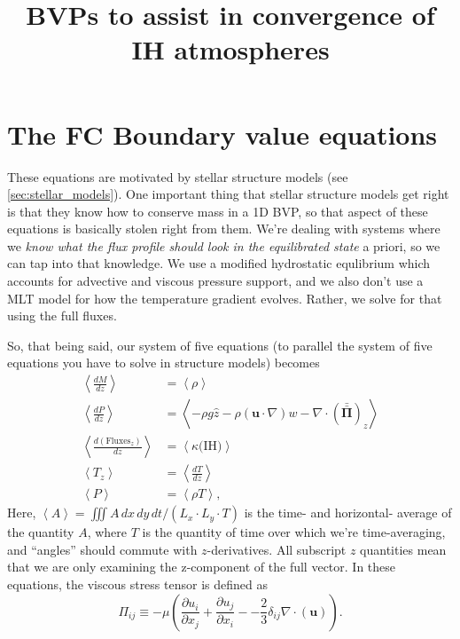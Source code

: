 \documentclass[aps, pre, onecolumn, nofootinbib, notitlepage, groupedaddress, amsfonts, amssymb, amsmath, longbibliography]{revtex4-1}
\newcommand{\Div}[1]{\ensuremath{\nabla\cdot\left( #1\right)}}
\newcommand{\angles}[1]{\ensuremath{\left\langle #1 \right\rangle}}
\newcommand{\grad}{\ensuremath{\nabla}}
\newcommand{\stressT}{\ensuremath{\bm{\bar{\bar{\Pi}}}}}
\begin{document}
\title{BVPs to assist in convergence of IH atmospheres}
\maketitle

\section{The FC Boundary value equations}
These equations are motivated by stellar structure models (see \ref{sec:stellar_models}).
One important thing that stellar structure models get right is that they know how to
conserve mass in a 1D BVP, so that aspect of these equations is basically stolen right
from them.  We're dealing with systems where we \emph{know what the flux profile should
look in the equilibrated state} a priori, so we can tap into that knowledge.  We use
a modified hydrostatic equlibrium which accounts for advective and viscous pressure
support, and we also don't use a MLT model for how the temperature gradient evolves.
Rather, we solve for that using the full fluxes.

So, that being said, our system of five equations (to parallel the system of 
five equations you have to solve in structure models) becomes
\begin{equation}
\begin{split}
\angles{\frac{d M}{dz}} &= \angles{\rho} \\
\angles{\frac{d P}{dz}} &= \angles{-\rho g \hat{z} - \rho (\bm{u}\cdot\grad)w - \Div{\stressT}_z} \\
\angles{\frac{d (\text{Fluxes}_z)}{d z}} &= \angles{\kappa \text{(IH)}} \\
\angles{T_{z}} &= \angles{\frac{d T}{d z}} \\
\angles{P} &= \angles{\rho T},
\end{split}
\end{equation}
Here, $\angles{A} = \iiint A \,dx\,dy\,dt / (L_x\cdot L_y \cdot T)$ is the time- and horizontal-
average of the quantity $A$, where $T$ is the quantity of time over which we're time-averaging,
and ``angles'' should commute with $z$-derivatives.
All subscript $z$ quantities mean that we are only examining the z-component of the full vector.
In these equations, the viscous stress tensor is defined as
\begin{equation}
\Pi_{ij} \equiv -\mu\left(\frac{\partial u_i}{\partial x_j} + \frac{\partial u_j}{\partial x_i} -
- \frac{2}{3}\delta_{ij}\Div{\bm{u}}\right).
\label{eqn:stress_tensor}
\end{equation}
\end{document}
